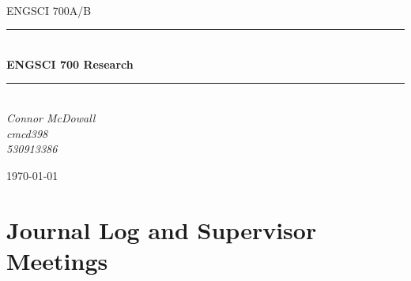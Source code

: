 \documentclass[12pt]{article}
\begin{document}
\begin{titlepage}
	\newcommand{\HRule}{\rule{\linewidth}{0.5mm}} %
	
	\center
	
	
	\textsc{\LARGE }\\[1.5cm] %
	
	\textsc{\Large ENGSCI 700A/B}\\[0.5cm] %
	
	
	\HRule\\[0.5cm]
	
	{\huge\bfseries ENGSCI 700 Research}\\[0.4cm] %
	
	\HRule\\[0.5cm]
	
	
	{\large\textit{Connor McDowall \\cmcd398 \\530913386}}\\
	
	
	\vfill\vfill\vfill %
	
	{\large\today} %
	 
	
	\vfill %
	
\end{titlepage}
\lstlistoflistings
\tableofcontents
\listoffigures
\listoftables

\newpage


\section{Journal Log and Supervisor Meetings}
\end{document}
